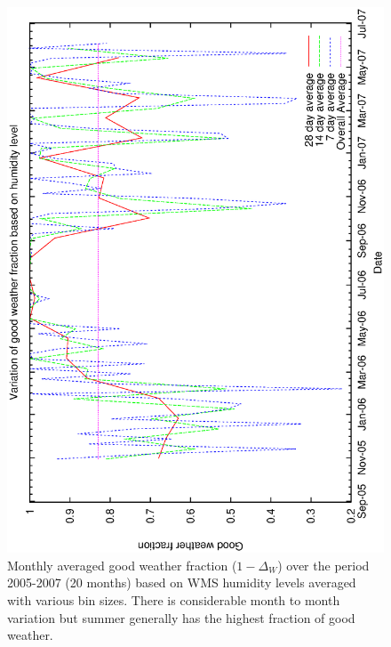 \begin{figure}[htbp]
\begin{center}
    \includegraphics[scale=0.4, angle=-90]{figures/ecs/hum_frac_time.eps}
\end{center} 
\caption[Monthly averaged good weather fraction based on humidity level.]
{Monthly averaged good weather fraction ($1-\Delta_W$) over the period 2005-2007 (20 months) based on WMS humidity levels averaged with various bin sizes. There is considerable month to month variation but summer generally has the highest fraction of good weather.} 
\label{fig:wms_hum_frac_time}
\end{figure}



